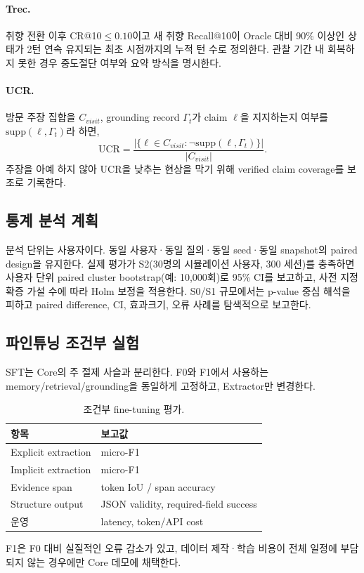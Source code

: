 \documentclass[10pt,a4paper,twocolumn]{article}
\begin{document}
\paragraph{Trec.} 취향 전환 이후 CR@10$\le 0.10$이고 새 취향 Recall@10이 Oracle 대비 90\% 이상인 상태가 2턴 연속 유지되는 최초 시점까지의 누적 턴 수로 정의한다. 관찰 기간 내 회복하지 못한 경우 중도절단 여부와 요약 방식을 명시한다.

\paragraph{UCR.} 방문 주장 집합을 $C_{visit}$, grounding record $\Gamma_t$가 claim $\ell$을 지지하는지 여부를 $\mathrm{supp}(\ell,\Gamma_t)$라 하면,
\begin{equation}
\mathrm{UCR}=\frac{|\{\ell\in C_{visit}: \neg\mathrm{supp}(\ell,\Gamma_t)\}|}{|C_{visit}|}.
\end{equation}
주장을 아예 하지 않아 UCR을 낮추는 현상을 막기 위해 verified claim coverage를 보조로 기록한다.

\subsection{통계 분석 계획}
분석 단위는 사용자이다. 동일 사용자·동일 질의·동일 seed·동일 snapshot의 paired design을 유지한다. 실제 평가가 S2(30명의 시뮬레이션 사용자, 300 세션)를 충족하면 사용자 단위 paired cluster bootstrap(예: 10,000회)로 95\% CI를 보고하고, 사전 지정 확증 가설 수에 따라 Holm 보정을 적용한다\cite{efron1993bootstrap,holm1979}. S0/S1 규모에서는 p-value 중심 해석을 피하고 paired difference, CI, 효과크기, 오류 사례를 탐색적으로 보고한다.

\subsection{파인튜닝 조건부 실험}
SFT는 Core의 주 절제 사슬과 분리한다. F0와 F1에서 사용하는 memory/retrieval/grounding을 동일하게 고정하고, Extractor만 변경한다.
\begin{table}[H]
\centering
\caption{조건부 fine-tuning 평가.}
\small
\begin{tabularx}{\columnwidth}{@{}p{}X@{}}
\toprule
항목 & 보고값 \\
\midrule
Explicit extraction & micro-F1 \\
Implicit extraction & micro-F1 \\
Evidence span & token IoU / span accuracy \\
Structure output & JSON validity, required-field success \\
운영 & latency, token/API cost \\
\bottomrule
\end{tabularx}
\end{table}
F1은 F0 대비 실질적인 오류 감소가 있고, 데이터 제작·학습 비용이 전체 일정에 부담되지 않는 경우에만 Core 데모에 채택한다.
\end{document}
